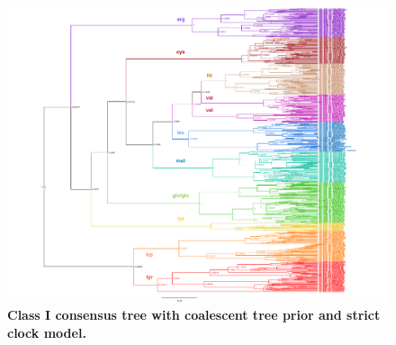 \documentclass[10pt,letterpaper]{article}
\begin{document}
\nolinenumbers

%
%
\begin{figure}
  \caption{\bf Class I consensus tree with coalescent tree prior and strict clock model.}
  \centering
    \includegraphics[width=\textwidth]{ClassI_Coalescent_1}
\end{figure}
\end{document}
